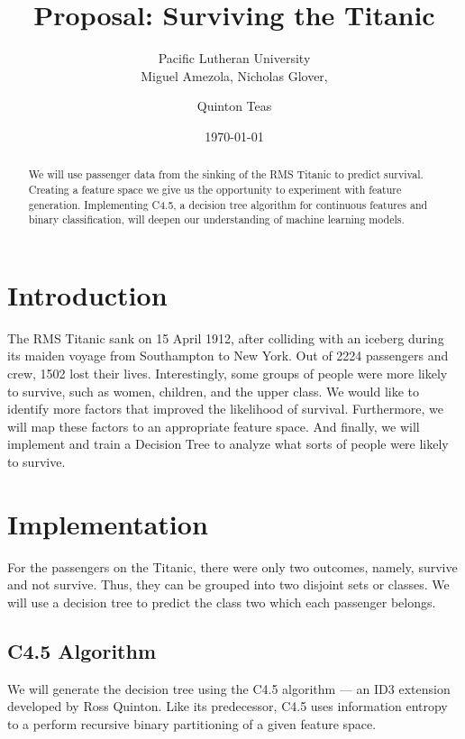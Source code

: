 \documentclass[12pt]{amsproc}
\title{Proposal: Surviving the Titanic}
\author{
	Pacific Lutheran University  \\
	Miguel Amezola,
	Nicholas Glover,
	\and Quinton Teas
}
\date{\today}
\newcommand\R{{\mathbb R}}
\theoremstyle{definition}
\newtheorem{definition}{Definition}
\begin{document}
	
	\maketitle
		
	\begin{abstract}
	We will use passenger data from the sinking of the RMS Titanic to predict survival. Creating a feature space we give us the opportunity to experiment with feature generation. Implementing C4.5, a decision tree algorithm for continuous features and binary classification, will deepen our understanding of machine learning models.
	\end{abstract}
	
	\section{Introduction}\label{intro}
	The RMS Titanic sank on 15 April 1912, after colliding with an iceberg during its maiden voyage from Southampton to New York. Out of 2224 passengers and crew, 1502 lost their lives. Interestingly, some groups of people were more likely to survive, such as women, children, and the upper class. We would like to identify more factors that improved the likelihood of survival. Furthermore, we will map these factors to an appropriate feature space. And finally, we will implement and train a Decision Tree to analyze what sorts of people were likely to survive.
	
	\section{Implementation}\label{implementation}
	
	For the passengers on the Titanic, there were only two outcomes, namely, survive and not survive. Thus, they can be grouped into two disjoint sets or classes. We will use a decision tree to predict the class two which each passenger belongs.
	
	\subsection{C4.5 Algorithm}\label{C4.5 Algorithm}
	We will generate the decision tree using the C4.5 algorithm --- an ID3 extension developed by Ross Quinton.
	Like its predecessor, C4.5 uses information entropy to a perform recursive binary partitioning of a given feature space. 
		
\end{document}
